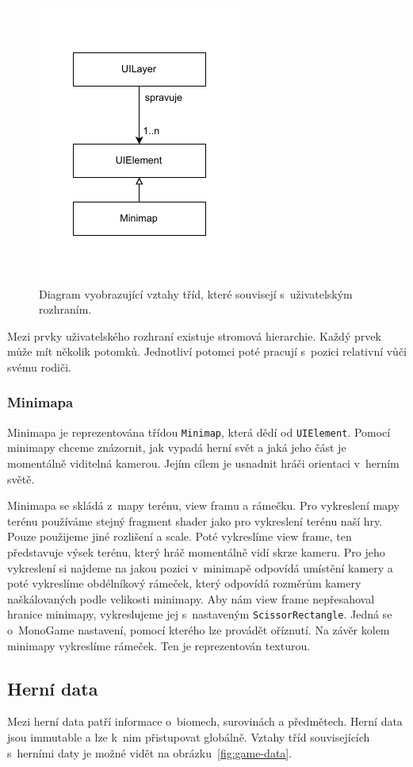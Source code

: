 \begin{figure}[!htb]
  \centering
  \includegraphics[width=0.35\linewidth]{img/ui-layer.pdf}
  \caption{Diagram vyobrazující vztahy tříd, které souvisejí s~uživatelským rozhraním.}
  \label{fig:ui-layer}
\end{figure}

\newpage

Mezi prvky uživatelského rozhraní existuje stromová hierarchie. Každý prvek může mít několik potomků. Jednotliví potomci poté pracují s~pozici relativní vůči svému rodiči.

\subsubsection{Minimapa}
Minimapa je reprezentována třídou \texttt{Minimap}, která dědí od \texttt{UIElement}. Pomocí minimapy chceme znázornit, jak vypadá herní svět a jaká jeho část je momentálně viditelná kamerou. Jejím cílem je usnadnit hráči orientaci v~herním světě.

Minimapa se skládá z~mapy terénu, view framu a rámečku. Pro vykreslení mapy terénu používáme stejný fragment shader jako pro vykreslení terénu naší hry. Pouze použijeme jiné rozlišení a scale. Poté vykreslíme view frame, ten představuje výsek terénu, který hráč momentálně vidí skrze kameru. Pro jeho vykreslení si najdeme na jakou pozici v~minimapě odpovídá umístění kamery a poté vykreslíme obdélníkový rámeček, který odpovídá rozměrům kamery naškálovaných podle velikosti minimapy. Aby nám view frame nepřesahoval hranice minimapy, vykreslujeme jej s~nastaveným \texttt{ScissorRectangle}. Jedná se o~MonoGame nastavení, pomocí kterého lze provádět oříznutí. Na závěr kolem minimapy vykreslíme rámeček. Ten je reprezentován texturou.

\subsection{Herní data}
Mezi herní data patří informace o~biomech, surovinách a předmětech. Herní data jsou immutable a lze k~nim přistupovat globálně. Vztahy tříd souvisejících s~herními daty je možné vidět na obrázku~\ref{fig:game-data}.

